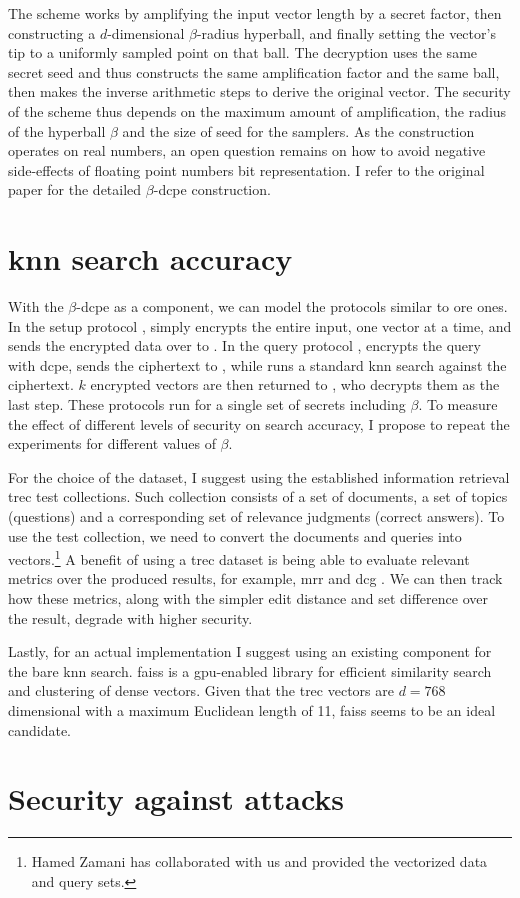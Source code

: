 		The scheme works by amplifying the input vector length by a secret factor, then constructing a $d$-dimensional $\beta$-radius hyperball, and finally setting the vector's tip to a uniformly sampled point on that ball.
		The decryption uses the same secret seed and thus constructs the same amplification factor and the same ball, then makes the inverse arithmetic steps to derive the original vector.
		The security of the scheme thus depends on the maximum amount of amplification, the radius of the hyperball $\beta$ and the size of seed for the samplers.
		As the construction operates on real numbers, an open question remains on how to avoid negative side-effects of floating point numbers bit representation.
		I refer to the original paper \cite{dcpe} for the detailed $\beta$-\acrshort{dcpe} construction.

	\section{\texorpdfstring{\acrshort{knn}}{kNN} search accuracy}

		With the $\beta$-\acrshort{dcpe} as a component, we can model the protocols similar to \acrshort{ore} ones.
		In the setup protocol \protocolSetup{}, \user{} simply encrypts the entire input, one vector at a time, and sends the encrypted data over to \server{}.
		In the query protocol \protocolQuery{}, \user{} encrypts the query with \acrshort{dcpe}, sends the ciphertext to \server{}, while \server{} runs a standard \acrshort{knn} search against the ciphertext.
		$k$ encrypted vectors are then returned to \user{}, who decrypts them as the last step.
		These protocols run for a single set of secrets including $\beta$.
		To measure the effect of different levels of security on search accuracy, I propose to repeat the experiments for different values of $\beta$.

		For the choice of the dataset, I suggest using the established information retrieval \acrshort{trec} test collections.
		Such collection consists of a set of documents, a set of topics (questions) and a corresponding set of relevance judgments (correct answers).
		To use the test collection, we need to convert the documents and queries into vectors.\footnote{
			Hamed Zamani has collaborated with us and provided the vectorized data and query sets.
		}
		A benefit of using a \acrshort{trec} dataset is being able to evaluate relevant metrics over the produced results, for example, \acrshort{mrr} \cite{mrr} and \acrshort{dcg} \cite{dcg}.
		We can then track how these metrics, along with the simpler edit distance and set difference over the result, degrade with higher security.

		Lastly, for an actual implementation I suggest using an existing component for the bare \acrshort{knn} search.
		\acrshort{faiss} \cite{faiss} is a \acrshort{gpu}-enabled library for efficient similarity search and clustering of dense vectors.
		Given that the \acrshort{trec} vectors are $d = 768$ dimensional with a maximum Euclidean length of 11, \acrshort{faiss} seems to be an ideal candidate.

	\section{Security against attacks}
